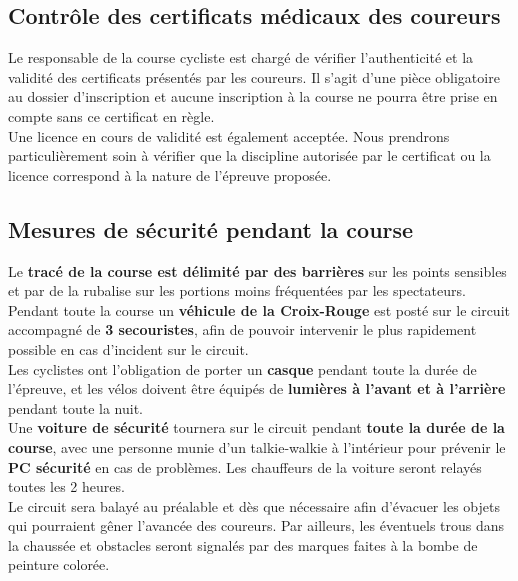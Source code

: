 \documentclass[hidelinks, paper=a4, fontsize=13pt]{report}
\begin{document}
\subsection{Contrôle des certificats médicaux des coureurs}

Le responsable de la course cycliste est chargé de vérifier l’authenticité et la validité des certificats présentés par les coureurs. Il s’agit d’une pièce obligatoire au dossier d’inscription et aucune inscription à la course ne pourra être prise en compte sans ce certificat en règle.\\
Une licence en cours de validité est également acceptée.
Nous prendrons particulièrement soin à vérifier que la discipline autorisée par le certificat ou la licence correspond à la nature de l’épreuve proposée.

\subsection{Mesures de sécurité pendant la course}

Le \textbf{tracé de la course est délimité par des barrières} sur les points sensibles et par de la rubalise sur les portions moins fréquentées par les spectateurs.\\

Pendant toute la course un \textbf{véhicule de la Croix-Rouge} est posté sur le circuit accompagné de \textbf{3 secouristes}, afin de pouvoir intervenir le plus rapidement possible en cas d’incident sur le circuit. \\

Les cyclistes ont l’obligation de porter un \textbf{casque} pendant toute la durée de l’épreuve, et les vélos doivent être équipés de \textbf{lumières à l’avant et à l’arrière} pendant toute la nuit.\\

Une \textbf{voiture de sécurité} tournera sur le circuit pendant \textbf{toute la durée de la course}, avec une personne munie d’un talkie-walkie à l’intérieur pour prévenir le \textbf{PC sécurité} en cas de problèmes. Les chauffeurs de la voiture seront relayés toutes les 2 heures.\\

Le circuit sera balayé au préalable et dès que nécessaire afin d’évacuer les objets qui pourraient gêner l’avancée des coureurs. Par ailleurs, les éventuels trous dans la chaussée et obstacles seront signalés par des marques faites à la bombe de peinture colorée.\\
\end{document}
